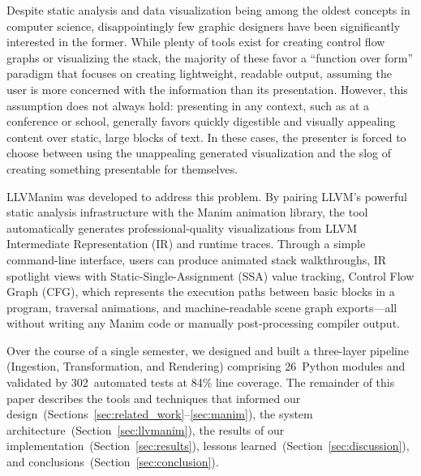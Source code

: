 Despite static analysis and data visualization being among the oldest concepts in computer science, disappointingly few graphic designers have been significantly interested in the former. While plenty of tools exist for creating control flow graphs or visualizing the stack, the majority of these favor a ``function over form'' paradigm that focuses on creating lightweight, readable output, assuming the user is more concerned with the information than its presentation. However, this assumption does not always hold: presenting in any context, such as at a conference or school, generally favors quickly digestible and visually appealing content over static, large blocks of text. In these cases, the presenter is forced to choose between using the unappealing generated visualization and the slog of creating something presentable for themselves.

LLVManim was developed to address this problem. By pairing LLVM's powerful static analysis infrastructure with the Manim animation library, the tool automatically generates professional-quality visualizations from LLVM Intermediate Representation (IR) and runtime traces. Through a simple command-line interface, users can produce animated stack walkthroughs, IR spotlight views with Static-Single-Assignment (SSA) value tracking, Control Flow Graph (CFG), which represents the execution paths between basic blocks in a program, traversal animations, and machine-readable scene graph exports---all without writing any Manim code or manually post-processing compiler output.

Over the course of a single semester, we designed and built a three-layer pipeline (Ingestion, Transformation, and Rendering) comprising 26~Python modules and validated by 302~automated tests at 84\% line coverage. The remainder of this paper describes the tools and techniques that informed our design~(Sections~\ref{sec:related_work}--\ref{sec:manim}), the system architecture~(Section~\ref{sec:llvmanim}), the results of our implementation~(Section~\ref{sec:results}), lessons learned~(Section~\ref{sec:discussion}), and conclusions~(Section~\ref{sec:conclusion}).
